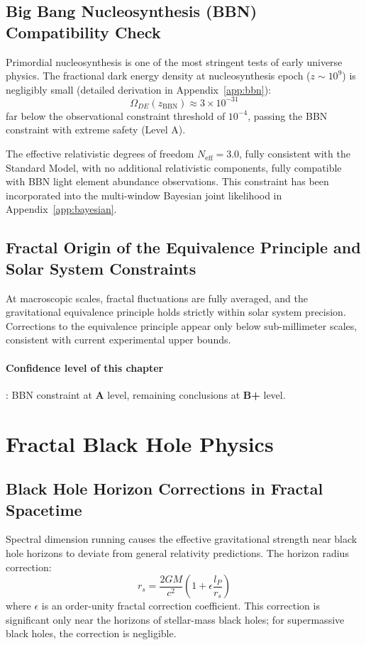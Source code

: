 \documentclass[12pt,a4paper,twocolumn]{article}
\begin{document}
\subsection{Big Bang Nucleosynthesis (BBN) Compatibility Check}
Primordial nucleosynthesis is one of the most stringent tests of early universe physics. The fractional dark energy density at nucleosynthesis epoch ($z\sim10^9$) is negligibly small (detailed derivation in Appendix~\ref{app:bbn}):
\[
\Omega_{DE}(z_{\text{BBN}}) \approx 3\times 10^{-31}
\]
far below the observational constraint threshold of $10^{-4}$, passing the BBN constraint with extreme safety (Level A).

The effective relativistic degrees of freedom $N_{\text{eff}} = 3.0$, fully consistent with the Standard Model, with no additional relativistic components, fully compatible with BBN light element abundance observations. This constraint has been incorporated into the multi-window Bayesian joint likelihood in Appendix~\ref{app:bayesian}.

\subsection{Fractal Origin of the Equivalence Principle and Solar System Constraints}
At macroscopic scales, fractal fluctuations are fully averaged, and the gravitational equivalence principle holds strictly within solar system precision. Corrections to the equivalence principle appear only below sub-millimeter scales, consistent with current experimental upper bounds.

\paragraph{Confidence level of this chapter}: BBN constraint at \textbf{A} level, remaining conclusions at \textbf{B+} level.

\section{Fractal Black Hole Physics}

\subsection{Black Hole Horizon Corrections in Fractal Spacetime}
Spectral dimension running causes the effective gravitational strength near black hole horizons to deviate from general relativity predictions. The horizon radius correction:
\[
r_s = \frac{2GM}{c^2} \left( 1 + \epsilon \frac{l_P}{r_s} \right)
\]
where $\epsilon$ is an order-unity fractal correction coefficient. This correction is significant only near the horizons of stellar-mass black holes; for supermassive black holes, the correction is negligible.
\end{document}
